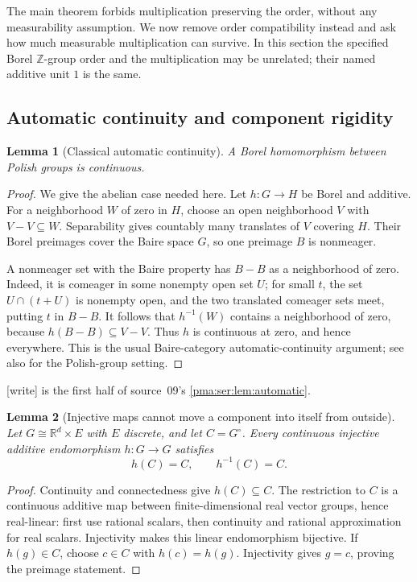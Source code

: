 \documentclass[11pt]{article}
\numberwithin{equation}{section}
\newtheorem{lemma}[lemma]{Lemma}
\theoremstyle{definition}
\theoremstyle{remark}
\newcommand{\Z}{\mathbb Z}
\newcommand{\R}{\mathbb R}
\newcommand{\writetag}{\textup{\textsf{\small[write]}}}
\begin{document}
The main theorem forbids multiplication preserving the order, without
any measurability assumption. We now remove order compatibility instead
and ask how much measurable multiplication can survive. In this section
the specified Borel $\Z$-group order and the multiplication may be
unrelated; their named additive unit $1$ is the same.

\subsection{Automatic continuity and component rigidity}
\begin{lemma}[Classical automatic continuity]\label{pma:lc:lem:auto}
A Borel homomorphism between Polish groups is continuous.
\end{lemma}
\begin{proof}
We give the abelian case needed here. Let $h:G\to H$ be Borel and
additive. For a neighborhood $W$ of zero in $H$, choose an open
neighborhood $V$ with $V-V\subseteq W$. Separability gives countably
many translates of $V$ covering $H$. Their Borel preimages cover the
Baire space $G$, so one preimage $B$ is nonmeager.

A nonmeager set with the Baire property has $B-B$ as a neighborhood of
zero. Indeed, it is comeager in some nonempty open set $U$; for small
$t$, the set $U\cap(t+U)$ is nonempty open, and the two translated
comeager sets meet, putting $t$ in $B-B$. It follows that $h^{-1}(W)$
contains a neighborhood of zero, because $h(B-B)\subseteq V-V$.
Thus $h$ is continuous at zero, and hence everywhere. This is the
usual Baire-category automatic-continuity argument; see also
\cite{Kechris} for the Polish-group setting.
\end{proof}

\noindent\writetag{}  is the first half of source~09's
\cref{pma:ser:lem:automatic}.

\begin{lemma}[Injective maps cannot move a component into itself from outside]
\label{pma:lc:lem:preimage}
Let $G\cong\R^d\times E$ with $E$ discrete, and let $C=G^\circ$.
Every continuous injective additive endomorphism $h:G\to G$ satisfies
\begin{equation}\label{pma:lc:eq:preimage}
 h(C)=C,\qquad h^{-1}(C)=C.
\end{equation}
\end{lemma}
\begin{proof}
Continuity and connectedness give $h(C)\subseteq C$. The restriction
to $C$ is a continuous additive map between finite-dimensional real
vector groups, hence real-linear: first use rational scalars, then
continuity and rational approximation for real scalars. Injectivity
makes this linear endomorphism bijective. If $h(g)\in C$, choose
$c\in C$ with $h(c)=h(g)$. Injectivity gives $g=c$, proving the
preimage statement.
\end{proof}
\end{document}
